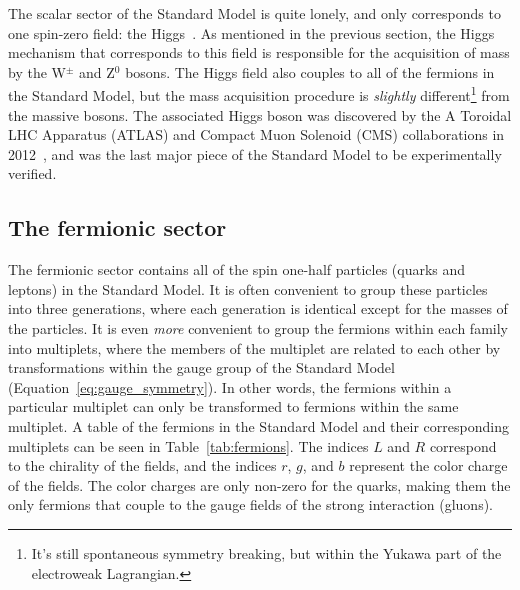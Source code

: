 The scalar sector of the Standard Model is quite lonely, and only corresponds to one spin-zero field: the Higgs~\cite{HiggsPaper}. As mentioned in the previous section, the Higgs mechanism that corresponds to this field is responsible for the acquisition of mass by the W$^{\pm}$ and Z$^{0}$ bosons. The Higgs field also couples to all of the fermions in the Standard Model, but the mass acquisition procedure is \textit{slightly} different\footnote{It's still spontaneous symmetry breaking, but within the Yukawa part of the electroweak Lagrangian.} from the massive bosons. The associated Higgs boson was discovered by the A Toroidal LHC Apparatus (ATLAS) and Compact Muon Solenoid (CMS) collaborations in 2012~\cite{HiggsDiscovery1, HiggsDiscovery2}, and was the last major piece of the Standard Model to be experimentally verified.


\subsection{The fermionic sector}
\label{sec:fermion_fields}

The fermionic sector contains all of the spin one-half particles (quarks and leptons) in the Standard Model. It is often convenient to group these particles into three generations, where each generation is identical except for the masses of the particles. It is even \textit{more} convenient to group the fermions within each family into multiplets, where the members of the multiplet are related to each other by transformations within the gauge group of the Standard Model (Equation~\ref{eq:gauge_symmetry}). In other words, the fermions within a particular multiplet can only be transformed to fermions within the same multiplet. A table of the fermions in the Standard Model and their corresponding multiplets can be seen in Table~\ref{tab:fermions}. The indices $L$ and $R$ correspond to the chirality of the fields, and the indices $r$, $g$, and $b$  represent the color charge of the fields. The color charges are only non-zero for the quarks, making them the only fermions that couple to the gauge fields of the strong interaction (gluons).



